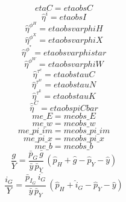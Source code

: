\begin{dmath}
{etaC}={etaobsC}
\end{dmath}
\begin{dmath}
{\hat{\eta}^{i}}={etaobsI}
\end{dmath}
\begin{dmath}
{\hat{\eta}^{\phi^H}}={etaobsvarphiH}
\end{dmath}
\begin{dmath}
{\hat{\eta}^{\phi^X}}={etaobsvarphiX}
\end{dmath}
\begin{dmath}
{\hat{\eta}^{\phi^*}}={etaobsvarphistar}
\end{dmath}
\begin{dmath}
{\hat{\eta}^{\phi^W}}={etaobsvarphiW}
\end{dmath}
\begin{dmath}
{\hat{\eta}^{\tau^c}}={etaobstauC}
\end{dmath}
\begin{dmath}
{\hat{\eta}^{\tau^w}}={etaobstauN}
\end{dmath}
\begin{dmath}
{\hat{\eta}^{\tau^k}}={etaobstauK}
\end{dmath}
\begin{dmath}
{\hat{\bar{\eta}}^C}={etaobspiCbar}
\end{dmath}
\begin{dmath}
{me\_E}={meobs\_E}
\end{dmath}
\begin{dmath}
{me\_w}={meobs\_w}
\end{dmath}
\begin{dmath}
{me\_pi\_im}={meobs\_pi\_im}
\end{dmath}
\begin{dmath}
{me\_pi\_x}={meobs\_pi\_x}
\end{dmath}
\begin{dmath}
{me\_b}={meobs\_b}
\end{dmath}
\begin{dmath}
{\frac{g}{Y}}=\frac{{\bar{p}_G}\, {\bar{g}}}{{\bar{y}}\, {\bar{p}_Y}}\, \left({\hat{p}_H}+{\hat{g}}-{\hat{p}_Y}-{\hat{y}}\right)
\end{dmath}
\begin{dmath}
{\frac{{i}_G}{Y}}=\frac{{\bar{p}_{I_G}}\, {\bar{i_G}}}{{\bar{y}}\, {\bar{p}_Y}}\, \left({\hat{p}_H}+{\hat{i}_G}-{\hat{p}_Y}-{\hat{y}}\right)
\end{dmath}
